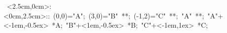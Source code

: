 
%
%

\hbox{
\xy    <2.5cm,0cm>:<0cm,2.5cm>::
       (0,0)="A";                  %
       (3,0)="B"        **\dir{-};    %
       (-1,2)="C"        **\dir{-};
       "A" **\dir{-};
	"A"+<-1em,-0.5ex> *{A}; 
	"B"+<1em,-0.5ex> *{B}; 
	"C"+<-1em,1ex> *{C}; 
       \endxy}


